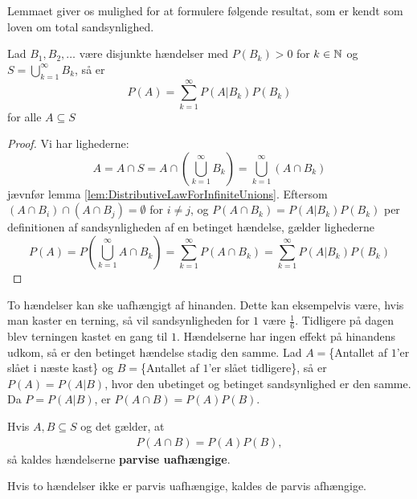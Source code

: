 Lemmaet giver os mulighed for at formulere følgende resultat, som er kendt som loven om total sandsynlighed.
\begin{thm} \label{thm:LPT}
Lad $B_1, B_2, \ldots$ være disjunkte hændelser med $P(B_k) > 0$ for $k \in \mathbb{N}$ og $S = \bigcup^\infty_{k = 1} B_k$, så er
\begin{equation*}
    P(A) = \sum^\infty_{k = 1} P(A | B_k)P(B_k)
\end{equation*}
for alle $A \subseteq S$
\end{thm}
\begin{proof}
Vi har lighederne:
\begin{equation*}
    A = A \cap S = A \cap \left( \bigcup^\infty_{k = 1} B_k \right) = \bigcup^\infty_{k = 1} (A \cap B_k)
\end{equation*}
jævnfør lemma \ref{lem:DistributiveLawForInfiniteUnions}. Eftersom $(A \cap B_i) \cap (A \cap B_j) = \emptyset$ for $i \neq j$, og $P(A \cap B_k) = P(A | B_k) P(B_k)$ per definitionen af sandsynligheden af en betinget hændelse, gælder lighederne
\begin{equation*}
    P(A) = P\left( \bigcup^\infty_{k = 1} A \cap B_k\right)= \sum^\infty_{k = 1} P(A \cap B_k) = \sum^\infty_{k = 1} P(A | B_k)P(B_k)
\end{equation*}
\end{proof}

To hændelser kan ske uafhængigt af hinanden. Dette kan eksempelvis være, hvis man kaster en terning, så vil sandsynligheden for $1$ være $\frac{1}{6}$. Tidligere på dagen blev terningen kastet en gang til $1$. Hændelserne har ingen effekt på hinandens udkom, så er den betinget hændelse stadig den samme. Lad $A=$\{Antallet af $1$'er slået i næste kast\} og $B=$\{Antallet af $1$'er slået tidligere\}, så er $P(A)=P(A|B)$, hvor den ubetinget og betinget sandsynlighed er den samme.  Da $P=P(A|B)$, er  $P(A\cap B)=P(A)P(B)$. 
\begin{defn} \label{Def:def1.5} %
Hvis $A, B \subseteq S$ og det gælder, at
\begin{align*}
    P(A\cap B)=P(A)P(B),
\end{align*}
så kaldes hændelserne \textbf{parvise uafhængige}.
\end{defn}
Hvis to hændelser ikke er parvis uafhængige, kaldes de parvis afhængige.

